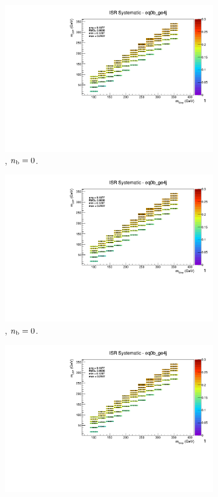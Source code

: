 \begin{figure}[ht!]
\begin{subfigure}[b]{0.32\textwidth}
    \includegraphics[width=\textwidth, page=12]{Figs/sms/t2cc/v37_2/systs/T2cc_ISR_eq0b_ge4j.pdf}
    \caption{\njhigh, $n_{\text{b}} = 0$.}
  \end{subfigure}
  \begin{subfigure}[b]{0.32\textwidth}
    \includegraphics[width=\textwidth, page=8]{Figs/sms/t2cc/v37_2/systs/T2cc_ISR_eq0b_ge4j.pdf}
    \caption{\njhigh, $n_{\text{b}} = 0$.}
  \end{subfigure}
  \begin{subfigure}[b]{0.32\textwidth}
    \includegraphics[width=\textwidth, page=1]{Figs/sms/t2cc/v37_2/systs/T2cc_ISR_eq0b_ge4j.pdf}

\end{subfigure}
\end{figure}
